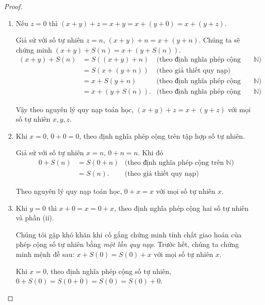 \begin{proof}
    \begin{enumerate}[label={(\roman*)}]
        \item Nếu $z = 0$ thì $(x + y) + z = x + y = x + (y + 0) = x + (y + z)$.

              Giả sử với số tự nhiên $z = n$, $(x + y) + n = x + (y + n)$. Chúng ta sẽ chứng minh $(x + y) + S(n) = x + (y + S(n))$.
              \begin{align*}
                  (x + y) + S(n) & = S((x + y) + n)  & \text{(theo định nghĩa phép cộng trên $\mathbb{N}$)} \\
                                 & = S(x + (y + n))  & \text{(theo giả thiết quy nạp)}                      \\
                                 & = x + S(y + n)    & \text{(theo định nghĩa phép cộng trên $\mathbb{N}$)} \\
                                 & = x + (y + S(n)). & \text{(theo định nghĩa phép cộng trên $\mathbb{N}$)}
              \end{align*}

              Vậy theo nguyên lý quy nạp toán học, $(x + y) + z = x + (y + z)$ với mọi số tự nhiên $x, y, z$.
        \item Khi $x = 0$, $0 + 0 = 0$, theo định nghĩa phép cộng trên tập hợp số tự nhiên.

              Giả sử với số tự nhiên $x = n$, $0 + n = n$. Khi đó
              \begin{align*}
                  0 + S(n) & = S(0 + n) & \text{(theo định nghĩa phép cộng trên $\mathbb{N}$)} \\
                           & = S(n).    & \text{(theo giả thiết quy nạp)}
              \end{align*}

              Theo nguyên lý quy nạp toán học, $0 + x = x$ với mọi số tự nhiên $x$.
        \item Khi $y = 0$ thì $x + 0 = x = 0 + x$, theo định nghĩa phép cộng hai số tự nhiên và phần (ii).

              Chúng tôi gặp khó khăn khi cố gắng chứng minh tính chất giao hoán của phép cộng số tự nhiên bằng \textit{một lần quy nạp}. Trước hết, chúng ta chứng minh mệnh đề sau: $x + S(0) = S(0) + x$ với mọi số tự nhiên $x$.

              Khi $x = 0$, theo định nghĩa phép cộng số tự nhiên, $0 + S(0) = S(0 + 0) = S(0) = S(0) + 0$.


\end{enumerate}
\end{proof}
